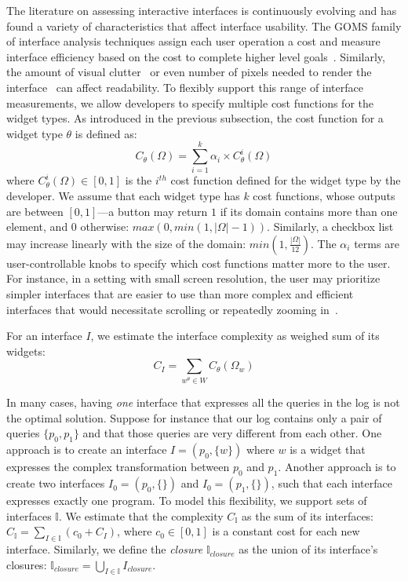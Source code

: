 The literature on assessing interactive interfaces is continuously evolving and has found a variety of characteristics that affect interface usability.   The GOMS family of interface analysis techniques  assign each user operation a cost and measure interface efficiency based on the cost to complete higher level goals~\cite{john1996goms,card1983psychology}.  Similarly, the amount of visual clutter~\cite{rosenholtz2007measuring} or even number of pixels needed to render the interface~\cite{peytchev2006web,jones1999improving} can affect readability. To flexibly support this range of interface measurements, we allow developers to specify multiple cost functions for the widget types.  As introduced in the previous subsection, the cost function for a widget type $\theta$ is defined as:
 $$C_\theta(\Omega) = \sum^k_{i=1} \alpha_{i} \times C^i_\theta(\Omega)$$
\noindent where $C^i_\theta(\Omega) \in [0, 1]$ is the $i^{th}$ cost function defined for the widget type by the developer.  We assume that each widget type has $k$ cost functions, whose outputs are between $[0, 1]$---a button may return $1$ if its domain contains more than one element, and $0$ otherwise: $max(0, min(1, |\Omega|-1))$.  Similarly, a checkbox list may increase linearly with the size of the domain: $min(1, \frac{|\Omega|}{12})$.  The $\alpha_{i}$ terms are user-controllable knobs to specify which cost functions matter more to the user.  For instance, in a setting with small screen resolution, the user may prioritize simpler interfaces that are easier to use than more complex and efficient interfaces that would necessitate scrolling or repeatedly zooming in~\cite{peytchev2006web}.

For an interface $I$, we estimate the interface complexity as weighed sum of its widgets:
$$C_I = \sum_{w^\theta \in W}  C_\theta(\Omega_w)$$


In many cases, having \emph{one} interface that expresses all the queries in the log is not the optimal solution. Suppose for instance that our log contains only a pair of queries $\{p_0, p_1\}$ and that those queries are very different from each other. One approach is to create an interface $I=(p_0, \{w\})$ where $w$ is a widget that expresses the complex transformation between $p_0$ and $p_1$. Another approach is to create two interfaces $I_0=(p_0, \{\})$ and $I_0=(p_1, \{\})$, such that each interface expresses exactly one program.
To model this flexibility, we support sets of interfaces $\mathbb{I}$. We estimate that the complexity $C_\mathbb{I}$ as the sum of its interfaces:$C_\mathbb{I} = \sum_{I \in \mathbb{I}} (c_0 + C_I)$, where $c_0 \in [0, 1]$ is a constant cost for each new interface.   Similarly, we define the \emph{closure} $\mathbb{I}_{closure}$ as the union of its interface's closures: $\mathbb{I}_{closure} = \bigcup_{I \in \mathbb{I}}  I_{closure}$.


